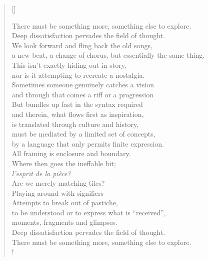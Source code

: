
\prelude

\settowidth{\versewidth}{a new beat, a change of chorus, but essentially the same thing.}

\begin{verse}[\versewidth]

There must be something more, something else to explore.\\
Deep dissatisfaction pervades the field of thought.\\
We look forward and fling back the old songs,\\
a new beat, a change of chorus, but essentially the same thing.\\
This isn't exactly hiding out in story,\\
nor is it attempting to recreate a nostalgia.\\
Sometimes someone genuinely catches a vision\\
and through that comes a riff or a progression\\
But bundles up fast in the syntax required\\
and therein, what flows first as inspiration,\\
is translated through culture and history,\\
must be mediated by a limited set of concepts,\\
by a language that only permits finite expression.\\
All framing is enclosure and boundary.\\
Where then goes the ineffable bit;\\
\textit{l'esprit de la pièce?}\\
Are we merely matching tiles?\\
Playing around with signifiers\\
Attempts to break out of pastiche,\\
to be understood or to express what is “received”,\\
moments, fragments and glimpses.\\
Deep dissatisfaction pervades the field of thought.\\
There must be something more, something else to explore.\\!

\end{verse}

\fugue

\settowidth{\versewidth}{Set your swiftest limbs and run like the winds.}

